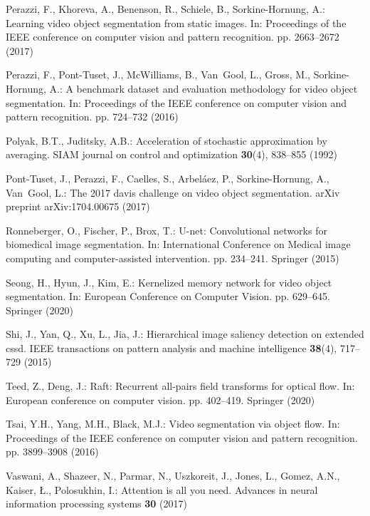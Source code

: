 \documentclass[runningheads]{llncs}
\begin{document}
\begin{thebibliography}{10}
Perazzi, F., Khoreva, A., Benenson, R., Schiele, B., Sorkine-Hornung, A.:
  Learning video object segmentation from static images. In: Proceedings of the
  IEEE conference on computer vision and pattern recognition. pp. 2663--2672
  (2017)

Perazzi, F., Pont-Tuset, J., McWilliams, B., Van~Gool, L., Gross, M.,
  Sorkine-Hornung, A.: A benchmark dataset and evaluation methodology for video
  object segmentation. In: Proceedings of the IEEE conference on computer
  vision and pattern recognition. pp. 724--732 (2016)

Polyak, B.T., Juditsky, A.B.: Acceleration of stochastic approximation by
  averaging. SIAM journal on control and optimization  \textbf{30}(4),
  838--855 (1992)

Pont-Tuset, J., Perazzi, F., Caelles, S., Arbel{\'a}ez, P., Sorkine-Hornung,
  A., Van~Gool, L.: The 2017 davis challenge on video object segmentation.
  arXiv preprint arXiv:1704.00675  (2017)

Ronneberger, O., Fischer, P., Brox, T.: U-net: Convolutional networks for
  biomedical image segmentation. In: International Conference on Medical image
  computing and computer-assisted intervention. pp. 234--241. Springer (2015)

Seong, H., Hyun, J., Kim, E.: Kernelized memory network for video object
  segmentation. In: European Conference on Computer Vision. pp. 629--645.
  Springer (2020)

Shi, J., Yan, Q., Xu, L., Jia, J.: Hierarchical image saliency detection on
  extended cssd. IEEE transactions on pattern analysis and machine intelligence
   \textbf{38}(4),  717--729 (2015)

Teed, Z., Deng, J.: Raft: Recurrent all-pairs field transforms for optical
  flow. In: European conference on computer vision. pp. 402--419. Springer
  (2020)

Tsai, Y.H., Yang, M.H., Black, M.J.: Video segmentation via object flow. In:
  Proceedings of the IEEE conference on computer vision and pattern
  recognition. pp. 3899--3908 (2016)

Vaswani, A., Shazeer, N., Parmar, N., Uszkoreit, J., Jones, L., Gomez, A.N.,
  Kaiser, {\L}., Polosukhin, I.: Attention is all you need. Advances in neural
  information processing systems  \textbf{30} (2017)


\end{thebibliography}
\end{document}

